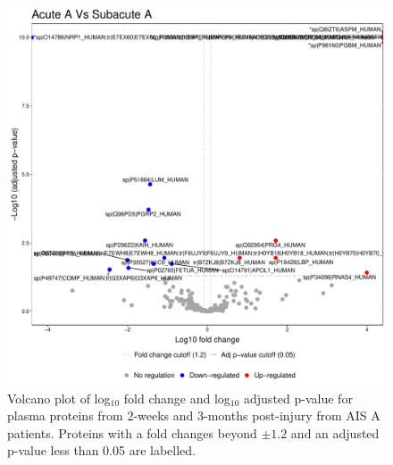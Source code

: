 \documentclass[9pt,lineno]{elife}
\begin{document}
\begin{figure}
\includegraphics[width=1\linewidth]{figures/openms_protein_quantification/label_free/volcano_plots/openms_volcano_plot_2021-08-10_0004} \caption{Volcano plot of log\(_10\) fold change and log\(_10\) adjusted p-value for plasma proteins from 2-weeks and 3-months post-injury from AIS A patients. Proteins with a fold changes beyond \(\pm 1.2\) and an adjusted p-value less than 0.05 are labelled.}\label{fig:volc-plot-acute-a-vs-subacute-a}
\end{figure}
\end{document}
